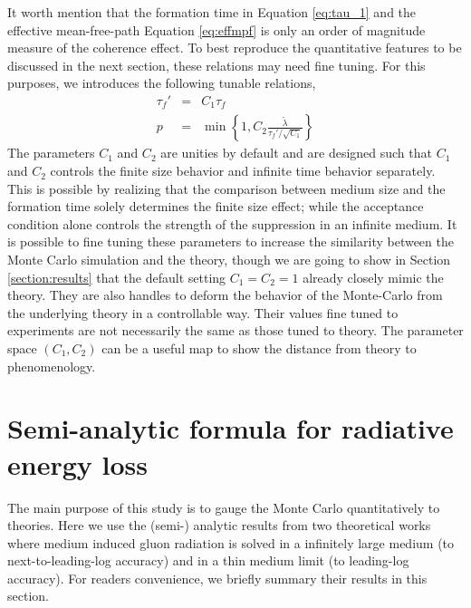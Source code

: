 \documentclass[aps, prc, reprint, amsmath, groupedaddress, nofootinbib]{revtex4-1}
\begin{document}
It worth mention that the formation time in Equation \ref{eq:tau_1} and the effective mean-free-path Equation \ref{eq:effmpf} is only an order of magnitude measure of the coherence effect. 
To best reproduce the quantitative features to be discussed in the next section, these relations may need fine tuning.
For this purposes, we introduces the following tunable relations,
\begin{eqnarray}\label{eq:tune}
\nonumber
\tau_f' &=& C_1 \tau_f \\
p &=& \min\left\{1, C_2\frac{\tilde{\lambda}}{\tau_f'/\sqrt{C_1}}\right\}
\end{eqnarray}
The parameters $C_1$ and $C_2$ are unities by default and are designed such that $C_1$ and $C_2$ controls the finite size behavior and infinite time behavior separately. 
This is possible by realizing that the comparison between medium size and the formation time solely determines the finite size effect; while the acceptance condition alone controls the strength of the suppression in an infinite medium.
It is possible to fine tuning these parameters to increase the similarity between the Monte Carlo simulation and the theory, though we are going to show in Section \ref{section:results} that the default setting $C_1 = C_2 = 1$ already closely mimic the theory.
They are also handles to deform the behavior of the Monte-Carlo from the underlying theory in a controllable way.
Their values fine tuned to experiments are not necessarily the same as those tuned to theory. 
The parameter space $(C_1, C_2)$ can be a useful map to show the distance from theory to phenomenology.

\section{Semi-analytic formula for radiative energy loss}\label{section:Theo}
The main purpose of this study is to gauge the Monte Carlo quantitatively to theories.
Here we use the (semi-) analytic results from two theoretical works where medium induced gluon radiation is solved in a infinitely large medium (to next-to-leading-log accuracy) and in a thin medium limit (to leading-log accuracy).
For readers convenience, we briefly summary their results in this section.
\end{document}

